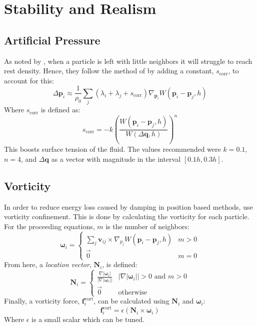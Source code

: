 \documentclass[sigplan,screen]{acmart}
\begin{document}
\section{Stability and Realism}
\label{sec:stability_corrections}

\subsection{Artificial Pressure}

As noted by \cite{Muller}, when a particle is left with little neighbors it will struggle to reach rest density. Hence, they follow the method of \cite{Monaghan2000} by adding a constant, $s_{\text{corr}}$, to account for this:
\begin{equation}
  \Delta \mathbf{p}_i \approx \frac{1}{\rho_0} \sum_j (\lambda_i + \lambda_j + s_{\text{corr}}) \nabla_{\mathbf{p}_i}W(\mathbf{p}_i - \mathbf{p}_j, h)
\end{equation}
Where $s_{\text{corr}}$ is defined as:
\begin{equation}
  s_{\text{corr}} = -k \left( \frac{W(\mathbf{p}_i - \mathbf{p}_j, h)}{W(\Delta \mathbf{q}, h)} \right)^n
\end{equation}
This boosts surface tension of the fluid. The values recommended were $k = 0.1$, $n = 4$, and $\Delta \mathbf{q}$ as a vector with magnitude in the interval $[0.1h, 0.3h]$.

\subsection{Vorticity}
In order to reduce energy loss caused by damping in position based methods, \cite{Muller} use vorticity confinement. This is done by calculating the vorticity for each particle. For the proceeding equations, $m$ is the number of neighbors:
\begin{equation}
  \boldsymbol{\omega}_i = \begin{cases} 
    \sum_j \mathbf{v}_{ij} \times \nabla_{p_j} W(\mathbf{p}_i - \mathbf{p}_j, h) & m > 0\\
    \vec{0} & m = 0
  \end{cases}
\end{equation}
From here, a \textit{location vector}, $\mathbf{N}_i$, is defined:
\begin{equation}
  \mathbf{N}_i = \begin{cases}
    \frac{\nabla | \boldsymbol{\omega}_i |}{|\nabla | \boldsymbol{\omega}_i ||} & |\nabla | \boldsymbol{\omega}_i || > 0\text{ and }m > 0\\
    \vec{0} & \text{otherwise}
    \end{cases}
\end{equation}
Finally, a vorticity force, $\mathbf{f}_i^{\text{vort}}$, can be calculated using $\mathbf{N}_i$ and $\mathbf{\omega}_i$:
\begin{equation}
  \mathbf{f}_i^{\text{vort}} = \epsilon (\mathbf{N}_i \times \boldsymbol{\omega}_i)
\end{equation}
Where $\epsilon$ is a small scalar which can be tuned.
\end{document}
